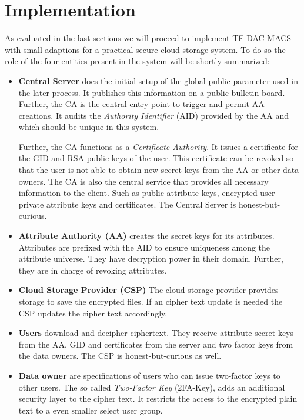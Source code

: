 \chapter{Implementation}
As evaluated in the last sections we will proceed to implement TF-DAC-MACS with small adaptions for a practical secure cloud storage system. To do so the role of the four entities present in the system will be shortly summarized:

\begin{itemize}
  \item \textbf{Central Server} does the initial setup of the global public parameter used in the later process. It publishes this information on a public bulletin board. Further, the CA is the central entry point to trigger and permit AA creations. It audits the \textit{Authority Identifier} (\ac{AID}) provided by the AA and which should be unique in this system. 

Further, the CA functions as a \textit{Certificate Authority}. It issues a certificate for the GID and RSA public keys of the user. This certificate can be revoked so that the user is not able to obtain new secret keys from the AA or other data owners.
The CA is also the central service that provides all necessary information to the client. Such as public attribute keys, encrypted user private attribute keys and certificates.
 The Central Server is honest-but-curious.
  \item \textbf{Attribute Authority (\ac{AA})} creates the secret keys for its attributes. Attributes are prefixed with the \ac{AID} to ensure uniqueness among the attribute universe. They have decryption power in their domain. Further, they are in charge of revoking attributes. 
  \item \textbf{Cloud Storage Provider (\ac{CSP})} The cloud storage provider provides storage to save the encrypted files. If an cipher text update is needed the CSP updates the cipher text accordingly. 
  \item \textbf{Users} download and decipher ciphertext. They receive attribute secret keys from the AA, GID and certificates from the server and two factor keys from the data owners. The CSP is honest-but-curious as well.
  \item \textbf{Data owner} are specifications of users who can issue two-factor keys to other users. The so called \textit{Two-Factor Key} (\ac{2FA}-Key), adds an additional security layer to the cipher text. It restricts the access to the encrypted plain text to a even smaller select user group.  
\end{itemize}

